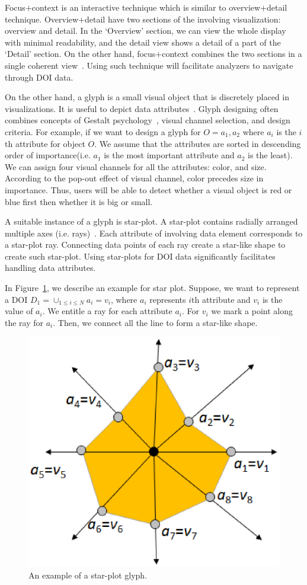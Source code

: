 Focus$+$context is an interactive technique which is similar to overview$+$detail technique. Overview$+$detail have two sections of the involving visualization: overview and detail. In the `Overview' section, we can view the whole display with minimal readability, and the detail view shows a detail of a part of the `Detail' section. On the other hand, focus+context combines the two sections in a single coherent view~\cite{spence1982data}. Using such technique will facilitate analyzers to navigate through DOI data. 

On the other hand, a glyph is a small visual object that is discretely placed in visualizations. It is useful to depict data attributes~\cite{borgo2013glyph}. Glyph designing often combines concepts of Gestalt psychology~\cite{kohler1970gestalt}, visual channel selection, and design criteria. For example, if we want to design a glyph for $O = {a_1, a_2}$ where $a_i$ is the $i$th attribute for object $O$. We assume that the attributes are sorted in descending order of importance(i.e. $a_1$ is the most important attribute and $a_2$ is the least). We can assign four visual channels for all the attributes: color, and size. According to the pop-out effect of visual channel, color precedes size in importance. Thus, users will be able to detect whether a visual object is red or blue first then whether it is big or small. 

A suitable instance of a glyph is star-plot. A star-plot contains radially arranged multiple axes (i.e. rays)~\cite{klippel2009star}. Each attribute of involving data element corresponds to a star-plot ray. Connecting data points of each ray create a star-like shape to create such star-plot. Using star-plots for DOI data significantly facilitates handling data attributes. 

In Figure~\ref{fig:StarplotExample}, we describe an example for star plot. Suppose, we want to represent a DOI $D_1=\cup_{1 \leq i \leq N}a_i=v_i $, where $a_i$ represents $i$th attribute and $v_i$ is the value of $a_i$. We entitle a ray for each attribute $a_i$. For $v_i$ we mark a point along the ray for $a_i$. Then, we connect all the line to form a star-like shape.  
\begin{figure}[htbp]
  \centering
  \includegraphics[width=0.5\linewidth]{images/StarplotExample.eps}
  \caption{An example of a star-plot glyph.}
	\label{fig:StarplotExample}
\end{figure}

